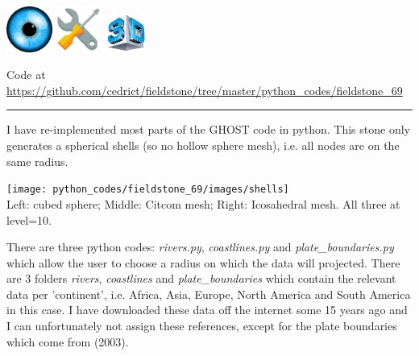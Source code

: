 \includegraphics[height=1.5cm]{images/pictograms/visualisation}
\includegraphics[height=1.5cm]{images/pictograms/tools}
\includegraphics[height=1.25cm]{images/pictograms/3d}




\begin{center}
Code at \url{https://github.com/cedrict/fieldstone/tree/master/python_codes/fieldstone_69}
\end{center}

\par\noindent\rule{\textwidth}{0.4pt}

I have re-implemented most parts of the GHOST code \cite{thie18} in python. 
This stone only generates a spherical shells (so no hollow sphere mesh), 
i.e. all nodes are on the same radius. 

\begin{center}
\texttt{[image: python\_codes/fieldstone\_69/images/shells]}\\
{\captionfont Left: cubed sphere; Middle: Citcom mesh; Right: Icosahedral mesh. 
All three at level=10.}
\end{center}

There are three python codes: {\sl rivers.py}, {\sl coastlines.py} and {\sl plate\_boundaries.py} 
which allow the user to choose a radius on which the data will projected. There are 3 folders 
{\sl rivers}, {\sl coastlines} and {\sl plate\_boundaries} which contain the relevant data per 
'continent', i.e. Africa, Asia, Europe, North America and South America in this case. 
I have downloaded these data off the internet some 15 years ago and I can unfortunately not assign 
these references, except for the plate boundaries which come from \textcite{bird03} (2003).

